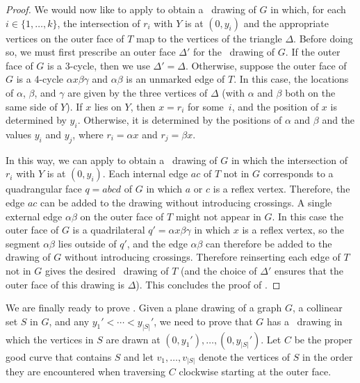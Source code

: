 \begin{proof}
We would now like to apply  to obtain a \Fary\ drawing
of $G$ in which, for each $i\in\{1,\ldots,k\}$, the intersection of
$r_i$ with $Y$ is at $(0,y_i)$ and the appropriate vertices on the
outer face of $T$ map to the vertices of the triangle $\Delta$.
Before doing so, we must first prescribe an outer face $\Delta'$ for
the \Fary\ drawing of $G$.  If the outer face of $G$ is a 3-cycle,
then we use $\Delta'=\Delta$.  Otherwise, suppose the outer face of
$G$ is a 4-cycle $\alpha x\beta\gamma$ and $\alpha\beta$ is an
unmarked edge of $T$.  In this case, the locations of $\alpha$,
$\beta$, and $\gamma$ are given by the three vertices of $\Delta$
(with $\alpha$ and $\beta$ both on the same side of $Y$).
If $x$ lies on $Y$,
then $x=r_i$ for some~$i$, %
and the
position of $x$ is determined by $y_i$.
Otherwise, it is determined
by the positions of $\alpha$ and $\beta$ and the values
$y_{i}$ and $y_j$, where $r_i=\alpha x$ and $r_j=\beta x$.

	In this way, we can apply  to
	obtain a \Fary\ drawing of $G$ in which the intersection of $r_i$
	with $Y$ is at $(0,y_i)$.  Each internal edge $ac$ of $T$ not in $G$
	corresponds to a quadrangular face $q=abcd$ of $G$ in which $a$ or $c$ is a
	reflex vertex.  Therefore, the edge $ac$ can be added to the drawing
	without introducing crossings.  A single external edge $\alpha\beta$
	on the outer face of $T$ might not appear in $G$. In this case the outer
	face of $G$ is a quadrilateral $q'=\alpha x \beta \gamma$ in which $x$ is
	a reflex vertex, so the segment $\alpha\beta$ lies outside of $q'$, and the edge $\alpha\beta$ can therefore be added to the drawing of $G$
	without introducing crossings. Therefore reinserting each edge of $T$ not in $G$ gives the desired \Fary\ drawing of $T$ (and the choice of $\Delta'$ ensures that the outer face of this drawing is $\Delta$). 
        This concludes the proof of .
\end{proof}

We are finally ready to prove . Given a plane drawing of
a graph $G$, a collinear set $S$ in $G$, and any $y_1'<\cdots<y_{|S|}'$,
we need to prove that $G$ has a \Fary\ drawing in which the vertices in
$S$ are drawn at $(0,y_1'),\ldots,(0,y_{|S|}')$.  Let $C$ be the proper
good curve that contains $S$ and let $v_1,\ldots,v_{|S|}$ denote the
vertices of $S$ in the order they are encountered when traversing $C$
clockwise starting at the outer face.  

